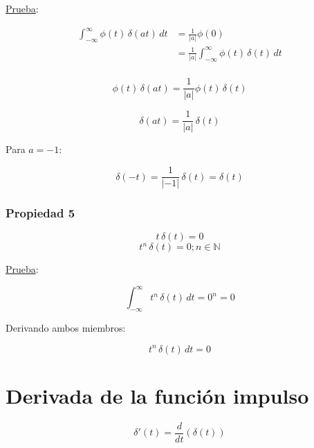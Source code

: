 \underline{Prueba}:

\begin{equation*}
\begin{split}
    \int_{-\infty}^{\infty}\phi(t)\,\delta(at)\,dt
        &=\frac{1}{|a|}\phi(0)\\
        &=\frac{1}{|a|}\int_{-\infty}^{\infty}\phi(t)\,\delta(t)\,dt\\
\end{split}
\end{equation*}

\begin{equation*}
    \phi(t)\,\delta(at)=\frac{1}{|a|}\phi(t)\,\delta(t)
\end{equation*}

\begin{equation*}
    \delta(at)=\frac{1}{|a|}\,\delta(t)
\end{equation*}

Para $a=-1$:

\begin{equation*}
    \delta(-t)=\frac{1}{|-1|}\,\delta(t)=\delta(t)
\end{equation*}

\subsubsection*{Propiedad 5}

\begin{equation*}
    t\,\delta(t)=0
\end{equation*}
\begin{equation*}
    t^n\,\delta(t)=0; n\in\mathbb{N}
\end{equation*}

\underline{Prueba}:

\begin{equation*}
    \int_{-\infty}^{\infty}t^n\,\delta(t)\,dt=0^n=0
\end{equation*}

Derivando ambos miembros:

\begin{equation*}
    t^n\,\delta(t)\,dt=0
\end{equation*}

\section{Derivada de la función impulso}

\begin{equation*}
    \delta'(t)=\frac{d}{dt}(\delta(t))
\end{equation*}

